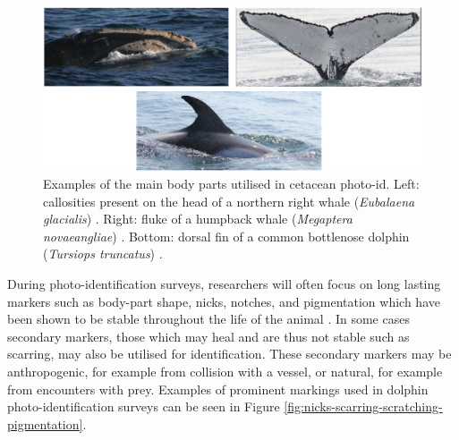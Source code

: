 \begin{figure}
	\begin{center}
		\includegraphics[scale=0.6]{Chapter2/figs/body-part-examples.png}
	\end{center}
	\caption{Examples of the main body parts utilised in cetacean photo-id. Left: callosities present on the head of a northern right whale (\textit{Eubalaena glacialis}) \cite{perrin_encyclopedia_2009}. Right: fluke of a humpback whale (\textit{Megaptera novaeangliae}) \cite{cheeseman_happywhale_2019}. Bottom: dorsal fin of a common bottlenose dolphin (\textit{Tursiops truncatus}) \cite{trotter_ndd20_2020}.
	}
	\label{fig:body-parts}
\end{figure}

During photo-identification surveys, researchers will often focus on long lasting markers such as body-part shape, nicks, notches, and pigmentation which have been shown to be stable throughout the life of the animal \cite{wursig_photographic_1977, lockyer_observations_1990, mann_cetacean_2000}. In some cases secondary markers, those which may heal and are thus not stable such as scarring, may also be utilised for identification. These secondary markers may be anthropogenic, for example from collision with a vessel, or natural, for example from encounters with prey. Examples of prominent markings used in dolphin photo-identification surveys can be seen in Figure \ref{fig:nicks-scarring-scratching-pigmentation}.

